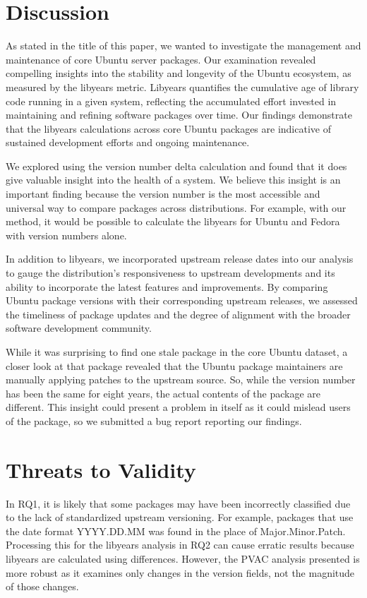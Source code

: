 \documentclass[sn-mathphys-num]{sn-jnl}%
\theoremstyle{thmstyleone}%
\theoremstyle{thmstyletwo}%
\theoremstyle{thmstylethree}%
\begin{document}
\section{Discussion}

As stated in the title of this paper, we wanted to investigate the management and maintenance of core Ubuntu server packages. Our examination revealed compelling insights into the stability and longevity of the Ubuntu ecosystem, as measured by the libyears metric. Libyears quantifies the cumulative age of library code running in a given system, reflecting the accumulated effort invested in maintaining and refining software packages over time. Our findings demonstrate that the libyears calculations across core Ubuntu packages are indicative of sustained development efforts and ongoing maintenance.

We explored using the version number delta calculation and found that it does give valuable insight into the health of a system. We believe this insight is an important finding because the version number is the most accessible and universal way to compare packages across distributions. For example, with our method, it would be possible to calculate the libyears for Ubuntu and Fedora with version numbers alone.

In addition to libyears, we incorporated upstream release dates into our analysis to gauge the distribution's responsiveness to upstream developments and its ability to incorporate the latest features and improvements. By comparing Ubuntu package versions with their corresponding upstream releases, we assessed the timeliness of package updates and the degree of alignment with the broader software development community.

While it was surprising to find one stale package in the core Ubuntu dataset, a closer look at that package revealed that the Ubuntu package maintainers are manually applying patches to the upstream source. So, while the version number has been the same for eight years, the actual contents of the package are different. This insight could present a problem in itself as it could mislead users of the package, so we submitted a bug report reporting our findings.

\section{Threats to Validity}
In RQ1, it is likely that some packages may have been incorrectly classified due to the lack of standardized upstream versioning. For example, packages that use the date format YYYY.DD.MM was found in the place of Major.Minor.Patch. Processing this for the libyears analysis in RQ2 can cause erratic results because libyears are calculated using differences. However, the PVAC analysis presented is more robust as it examines only changes in the version fields, not the magnitude of those changes.
\end{document}
